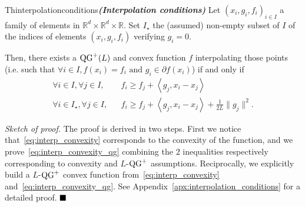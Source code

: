         \begin{center}
            \begin{restatable}{Th}{interpolationconditions}\textbf{\emph{(Interpolation conditions)}}
                \label{thm:interp}
                Let $(x_i, g_i, f_i)_{i \in I}$ a family of elements in $\mathbb{R}^d \times \mathbb{R}^d \times \mathbb{R}$.
                Set $I_\star$ the (assumed) non-empty subset of $I$ of the indices of elements $(x_i, g_i, f_i)$ verifying $g_i=0$.

                Then, there exists a $\operatorname{QG}^+(L)$ and convex function $f$ interpolating those points (i.e. such that $\forall i \in I, f(x_i) = f_i \text{ and } g_i \in \partial f(x_i)$) if and only if
                \begin{eqnarray}
                    \forall i \in I, \forall j \in I, && f_i \geq f_j + \left< g_j, x_i - x_j \right> \label{eq:interp_convexity} \\
                    \forall i \in I_\star, \forall j \in I, && f_i \geq f_j + \left< g_j, x_i - x_j \right> + \frac{1}{2L} \|g_j\|^2 .\label{eq:interp_convexity_qg}
                \end{eqnarray}
            \end{restatable}
        \end{center}

        \noindent \textit{Sketch of proof.}
            The proof is derived in two steps.
            First we notice that~\eqref{eq:interp_convexity} corresponds to the convexity of the function, and we prove~\eqref{eq:interp_convexity_qg} combining the $2$ inequalities respectively corresponding to convexity and $L$-$\operatorname{QG}^+$ assumptions.
            Reciprocally, we explicitly build a $L$-$\operatorname{QG}^+$ convex function from~\eqref{eq:interp_convexity} and~\eqref{eq:interp_convexity_qg}.
            See Appendix~\ref{apx:interpolation_conditions} for a detailed proof.
        $\hfill\blacksquare$

